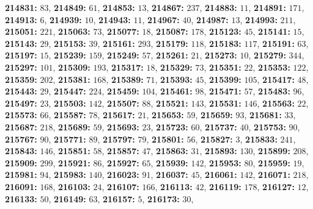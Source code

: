 \textsf{\bfseries 214831:} $83$, \textsf{\bfseries 214849:} $61$, \textsf{\bfseries 214853:} $13$, \textsf{\bfseries 214867:} $237$, \textsf{\bfseries 214883:} $11$, \textsf{\bfseries 214891:} $171$, \textsf{\bfseries 214913:} $6$, \textsf{\bfseries 214939:} $10$, \textsf{\bfseries 214943:} $11$, \textsf{\bfseries 214967:} $40$, \textsf{\bfseries 214987:} $13$, \textsf{\bfseries 214993:} $211$, \textsf{\bfseries 215051:} $221$, \textsf{\bfseries 215063:} $73$, \textsf{\bfseries 215077:} $18$, \textsf{\bfseries 215087:} $178$, \textsf{\bfseries 215123:} $45$, \textsf{\bfseries 215141:} $15$, \textsf{\bfseries 215143:} $29$, \textsf{\bfseries 215153:} $39$, \textsf{\bfseries 215161:} $293$, \textsf{\bfseries 215179:} $118$, \textsf{\bfseries 215183:} $117$, \textsf{\bfseries 215191:} $63$, \textsf{\bfseries 215197:} $15$, \textsf{\bfseries 215239:} $159$, \textsf{\bfseries 215249:} $57$, \textsf{\bfseries 215261:} $21$, \textsf{\bfseries 215273:} $10$, \textsf{\bfseries 215279:} $344$, \textsf{\bfseries 215297:} $101$, \textsf{\bfseries 215309:} $193$, \textsf{\bfseries 215317:} $18$, \textsf{\bfseries 215329:} $73$, \textsf{\bfseries 215351:} $22$, \textsf{\bfseries 215353:} $122$, \textsf{\bfseries 215359:} $202$, \textsf{\bfseries 215381:} $168$, \textsf{\bfseries 215389:} $71$, \textsf{\bfseries 215393:} $45$, \textsf{\bfseries 215399:} $105$, \textsf{\bfseries 215417:} $48$, \textsf{\bfseries 215443:} $29$, \textsf{\bfseries 215447:} $224$, \textsf{\bfseries 215459:} $104$, \textsf{\bfseries 215461:} $98$, \textsf{\bfseries 215471:} $57$, \textsf{\bfseries 215483:} $96$, \textsf{\bfseries 215497:} $23$, \textsf{\bfseries 215503:} $142$, \textsf{\bfseries 215507:} $88$, \textsf{\bfseries 215521:} $143$, \textsf{\bfseries 215531:} $146$, \textsf{\bfseries 215563:} $22$, \textsf{\bfseries 215573:} $66$, \textsf{\bfseries 215587:} $78$, \textsf{\bfseries 215617:} $21$, \textsf{\bfseries 215653:} $59$, \textsf{\bfseries 215659:} $93$, \textsf{\bfseries 215681:} $33$, \textsf{\bfseries 215687:} $218$, \textsf{\bfseries 215689:} $59$, \textsf{\bfseries 215693:} $23$, \textsf{\bfseries 215723:} $60$, \textsf{\bfseries 215737:} $40$, \textsf{\bfseries 215753:} $90$, \textsf{\bfseries 215767:} $90$, \textsf{\bfseries 215771:} $89$, \textsf{\bfseries 215797:} $79$, \textsf{\bfseries 215801:} $56$, \textsf{\bfseries 215827:} $3$, \textsf{\bfseries 215833:} $241$, \textsf{\bfseries 215843:} $146$, \textsf{\bfseries 215851:} $58$, \textsf{\bfseries 215857:} $47$, \textsf{\bfseries 215863:} $31$, \textsf{\bfseries 215893:} $130$, \textsf{\bfseries 215899:} $208$, \textsf{\bfseries 215909:} $299$, \textsf{\bfseries 215921:} $86$, \textsf{\bfseries 215927:} $65$, \textsf{\bfseries 215939:} $142$, \textsf{\bfseries 215953:} $80$, \textsf{\bfseries 215959:} $19$, \textsf{\bfseries 215981:} $94$, \textsf{\bfseries 215983:} $140$, \textsf{\bfseries 216023:} $91$, \textsf{\bfseries 216037:} $45$, \textsf{\bfseries 216061:} $142$, \textsf{\bfseries 216071:} $218$, \textsf{\bfseries 216091:} $168$, \textsf{\bfseries 216103:} $24$, \textsf{\bfseries 216107:} $166$, \textsf{\bfseries 216113:} $42$, \textsf{\bfseries 216119:} $178$, \textsf{\bfseries 216127:} $12$, \textsf{\bfseries 216133:} $50$, \textsf{\bfseries 216149:} $63$, \textsf{\bfseries 216157:} $5$, \textsf{\bfseries 216173:} $30$, 
